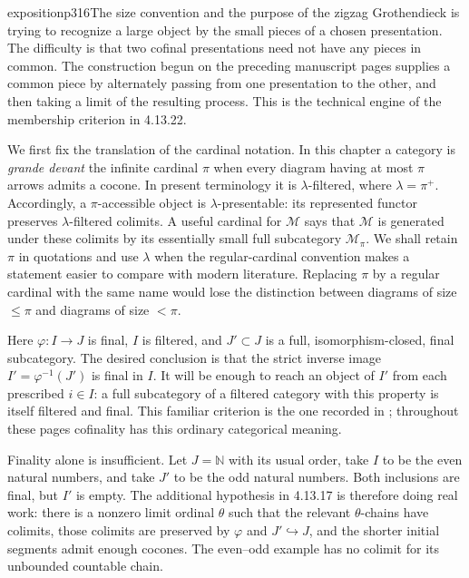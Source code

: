 
\begin{dcomment}{exposition}{p316}{The size convention and the purpose of the zigzag}
Grothendieck is trying to recognize a large object by the small pieces of a chosen presentation. The difficulty is that two cofinal presentations need not have any pieces in common. The construction begun on the preceding manuscript pages supplies a common piece by alternately passing from one presentation to the other, and then taking a limit of the resulting process. This is the technical engine of the membership criterion in 4.13.22.

We first fix the translation of the cardinal notation. In this chapter a category is \emph{grande devant} the infinite cardinal $\pi$ when every diagram having at most $\pi$ arrows admits a cocone. In present terminology it is $\lambda$-filtered, where $\lambda=\pi^+$. Accordingly, a $\pi$-accessible object is $\lambda$-presentable: its represented functor preserves $\lambda$-filtered colimits. A useful cardinal for $\mathcal M$ says that $\mathcal M$ is generated under these colimits by its essentially small full subcategory $\mathcal M_\pi$. We shall retain $\pi$ in quotations and use $\lambda$ when the regular-cardinal convention makes a statement easier to compare with modern literature. Replacing $\pi$ by a regular cardinal with the same name would lose the distinction between diagrams of size $\leq\pi$ and diagrams of size $<\pi$.

Here $\varphi:I\longrightarrow J$ is final, $I$ is filtered, and $J'\subset J$ is a full, isomorphism-closed, final subcategory. The desired conclusion is that the strict inverse image $I'=\varphi^{-1}(J')$ is final in $I$. It will be enough to reach an object of $I'$ from each prescribed $i\in I$: a full subcategory of a filtered category with this property is itself filtered and final. This familiar criterion is the one recorded in \citet[Lemma 4.19.3]{StacksFiltered}; throughout these pages cofinality has this ordinary categorical meaning.

Finality alone is insufficient. Let $J=\mathbb N$ with its usual order, take $I$ to be the even natural numbers, and take $J'$ to be the odd natural numbers. Both inclusions are final, but $I'$ is empty. The additional hypothesis in 4.13.17 is therefore doing real work: there is a nonzero limit ordinal $\theta$ such that the relevant $\theta$-chains have colimits, those colimits are preserved by $\varphi$ and $J'\hookrightarrow J$, and the shorter initial segments admit enough cocones. The even--odd example has no colimit for its unbounded countable chain.


\end{dcomment}
